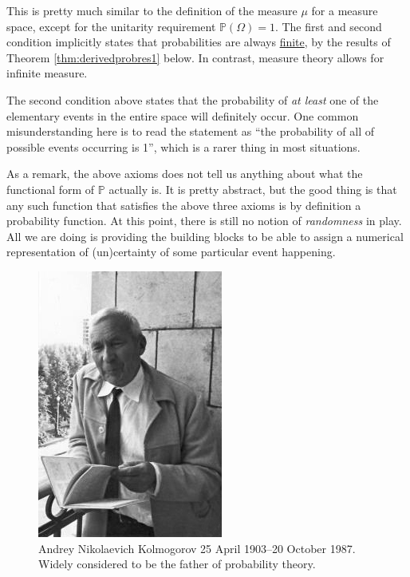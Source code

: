 \documentclass[
]{book}
\newcommand{\bbP}{\mathbb{P}}
\theoremstyle{definition}
\theoremstyle{definition}
\theoremstyle{definition}
\theoremstyle{definition}
\theoremstyle{remark}
\begin{document}
This is pretty much similar to the definition of the measure \(\mu\) for a measure space, except for the unitarity requirement \(\bbP(\Omega)=1\).
The first and second condition implicitly states that probabilities are always \uline{finite}, by the results of Theorem \ref{thm:derivedprobres1} below.
In contrast, measure theory allows for infinite measure.

The second condition above states that the probability of \emph{at least} one of the elementary events in the entire space will definitely occur.
One common misunderstanding here is to read the statement as ``the probability of all of possible events occurring is 1'', which is a rarer thing in most situations.

As a remark, the above axioms does not tell us anything about what the functional form of \(\bbP\) actually is.
It is pretty abstract, but the good thing is that any such function that satisfies the above three axioms is by definition a probability function.
At this point, there is still no notion of \emph{randomness} in play.
All we are doing is providing the building blocks to be able to assign a numerical representation of (un)certainty of some particular event happening.

\begin{figure}

{\centering \includegraphics[width=0.5\linewidth]{figure/kolmogorov} 

}

\caption{Andrey Nikolaevich Kolmogorov 25 April 1903--20 October 1987. Widely considered to be the father of probability theory.}\label{fig:kolmogorov}
\end{figure}
\end{document}
